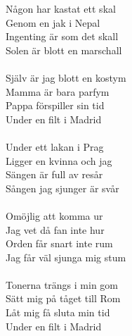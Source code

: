 Någon har kastat ett skal\\
Genom en jak i Nepal\\
Ingenting är som det skall\\
Solen är blott en marschall\\
\\
Själv är jag blott en kostym\\
Mamma är bara parfym\\
Pappa förspiller sin tid\\
Under en filt i Madrid\\
\\
Under ett lakan i Prag\\
Ligger en kvinna och jag\\
Sängen är full av resår\\
Sången jag sjunger är svår\\
\\
Omöjlig att komma ur\\
Jag vet då fan inte hur\\
Orden får snart inte rum\\
Jag får väl sjunga mig stum\\
\\
Tonerna trängs i min gom\\
Sätt mig på tåget till Rom\\
Låt mig få sluta min tid\\
Under en filt i Madrid

